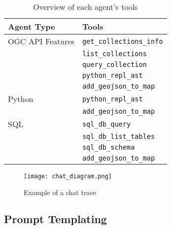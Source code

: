 \begin{table}
    \centering
    \caption{Overview of each agent's tools}
    \label{tbl:agent-tool-overview}
    \begin{tabularx}{0.7\textwidth}{XX}
        \toprule
        \textbf{Agent Type} & \textbf{Tools}                  \\
        \midrule
        OGC API Features    & \texttt{get\_collections\_info} \\
                            & \texttt{list\_collections}      \\
                            & \texttt{query\_collection}      \\
                            & \texttt{python\_repl\_ast}      \\
                            & \texttt{add\_geojson\_to\_map}  \\
        \midrule
        Python              & \texttt{python\_repl\_ast}      \\
                            & \texttt{add\_geojson\_to\_map}  \\
        \midrule
        SQL                 & \texttt{sql\_db\_query}         \\
                            & \texttt{sql\_db\_list\_tables}  \\
                            & \texttt{sql\_db\_schema}        \\
                            & \texttt{add\_geojson\_to\_map}  \\
        \bottomrule
    \end{tabularx}
\end{table}

\begin{figure}
    \centering
    \texttt{[image: chat\_diagram.png]}
    \caption{Example of a chat trace}
    \label{fig:chat-trace-example}
\end{figure}


\subsection{Prompt Templating}
\label{subsec:prompt-templating}


